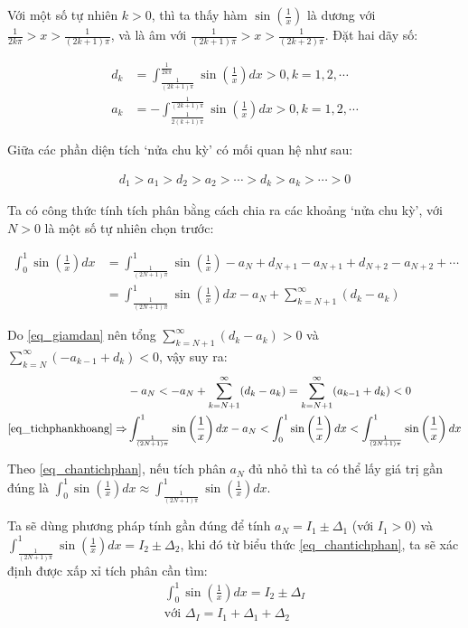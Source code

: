 \documentclass[12pt]{article}
\begin{document}
Với một số tự nhiên $k>0$, thì ta thấy hàm $\sin (\frac{1}{x})$ là dương với $\frac{1}{2k\pi} > x > \frac{1}{(2k+1)\pi}$, và là âm với $\frac{1}{(2k+1)\pi} > x > \frac{1}{(2k+2)\pi}$. Đặt hai dãy số:

\begin{align*}
 d_k &= \int_{\frac{1}{(2k+1)\pi}}^{\frac{1}{2k\pi}} \sin \left( \frac{1}{x} \right) dx > 0, k=1, 2, \cdots \\
 a_k &= - \int_{\frac{1}{2(k+1)\pi}}^{\frac{1}{(2k+1)\pi}} \sin \left( \frac{1}{x} \right) dx > 0, k=1, 2, \cdots
\end{align*}

Giữa các phần diện tích `nửa chu kỳ' có mối quan hệ như sau:

\begin{align}\label{eq_giamdan}
 d_1 > a_1 > d_2 > a_2 > \cdots > d_k > a_k > \cdots > 0
\end{align}

Ta có công thức tính tích phân bằng cách chia ra các khoảng `nửa chu kỳ', với $N>0$ là một số tự nhiên chọn trước:

\begin{align} \label{eq_tichphankhoang}
 \int_{0}^1  \sin \left( \frac 1 x \right) dx &= \int_{\frac{1}{(2N+1)\pi}}^1 \sin \left( \frac{1}{x} \right) -a_{N} + d_{N+1} - a_{N+1} + d_{N+2} - a_{N+2} + \cdots \nonumber \\
 &= \int_{\frac{1}{(2N+1)\pi}}^1 \sin \left( \frac{1}{x} \right) dx -a_{N} + \sum_{k=N+1}^{\infty} (d_k - a_{k})
 \end{align}

Do \eqref{eq_giamdan} nên tổng $\sum_{k=N+1}^{\infty} (d_k-a_{k}) > 0$ và  $\sum_{k=N}^{\infty} (-a_{k-1}+d_k) < 0$, vậy suy ra:
\begin{align}
 &-a_{N} < -a_{N} + \sum_{k=N+1}^{\infty} (d_k - a_{k}) = \sum_{k=N+1}^{\infty} (a_{k-1}+d_k) < 0 \\
 \eqref{eq_tichphankhoang}\Rightarrow &\int_{\frac{1}{(2N+1)\pi}}^1 \sin \left( \frac{1}{x} \right) dx - a_{N} < \int_{0}^1  \sin \left( \frac 1 x \right) dx < \int_{\frac{1}{(2N+1)\pi}}^1 \sin \left( \frac{1}{x} \right) dx \label{eq_chantichphan}
\end{align}

Theo \eqref{eq_chantichphan}, nếu tích phân $a_{N}$ đủ nhỏ thì ta có thể lấy giá trị gần đúng là $\int_{0}^1  \sin \left( \frac 1 x \right) dx \approx \int_{\frac{1}{(2N+1)\pi}}^1 \sin \left( \frac{1}{x} \right) dx$.

Ta sẽ dùng phương pháp tính gần đúng để tính $a_{N} = I_1 \pm \Delta_1$ (với $I_1>0$) và $\int_{\frac{1}{(2N+1)\pi}}^1 \sin \left( \frac{1}{x} \right) dx = I_2 \pm \Delta_2$, khi đó từ biểu thức \eqref{eq_chantichphan}, ta sẽ xác định được xấp xỉ tích phân cần tìm:
\begin{align}
 \int_{0}^1  \sin \left( \frac 1 x \right) dx = I_2 \pm \Delta_I \\
 \textrm{với~} \Delta_I = I_1 + \Delta_1 + \Delta_2 \label{eq_tongsaiso}
\end{align}
\end{document}
